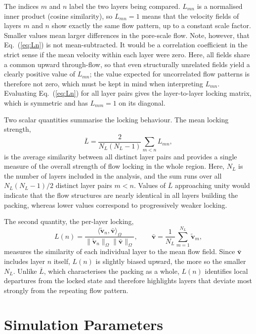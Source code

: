 The indices $m$ and $n$ label the two layers being compared. $L_{mn}$ is a normalised inner product (cosine similarity), so $L_{mn}=1$ means that the velocity fields of layers $m$ and $n$ show exactly the same flow pattern, up to a constant scale factor. Smaller values mean larger differences in the pore-scale flow. Note, however, that Eq.~(\ref{eq:Ln}) is not mean-subtracted. It would be a correlation coefficient in the strict sense if the mean velocity within each layer were zero. Here, all fields share a common upward through-flow, so that even structurally unrelated fields yield a clearly positive value of $L_{mn}$; the value expected for uncorrelated flow patterns is therefore not zero, which must be kept in mind when interpreting $L_{mn}$. Evaluating Eq.~(\ref{eq:Ln}) for all layer pairs gives the layer-to-layer locking matrix, which is symmetric and has $L_{mm}=1$ on its diagonal.

Two scalar quantities summarise the locking behaviour. The mean locking strength,
\begin{equation}
\overline{L}
=
\frac{2}{N_L(N_L-1)}
\sum_{m<n}
L_{mn},
\label{eq:Lbar}
\end{equation}
is the average similarity between all distinct layer pairs and provides a single measure of the overall strength of flow locking in the whole region. Here, $N_L$ is the number of layers included in the analysis, and the sum runs over all $N_L(N_L-1)/2$ distinct layer pairs $m<n$. Values of $\overline{L}$ approaching unity would indicate that the flow structures are nearly identical in all layers building the packing, whereas lower values correspond to progressively weaker locking.

The second quantity, the per-layer locking,
\begin{equation}
L(n)
=
\frac{\langle\tilde{\bm{v}}_n,\bar{\bm{v}}\rangle_{\Omega}}
{\|\tilde{\bm{v}}_n\|_{\Omega}
\|\bar{\bm{v}}\|_{\Omega}},
\qquad
\bar{\bm{v}}
=
\frac{1}{N_L}
\sum_{m=1}^{N_L}
\tilde{\bm{v}}_m,
\label{eq:Lofn}
\end{equation}
measures the similarity of each individual layer to the mean flow field. Since $\bar{\bm{v}}$ includes layer $n$ itself, $L(n)$ is slightly biased upward, the more so the smaller $N_L$. Unlike $\overline{L}$, which characterises the packing as a whole, $L(n)$ identifies local departures from the locked state and therefore highlights layers that deviate most strongly from the repeating flow pattern.

\section{Simulation Parameters}
\label{sec:numerics:params}

